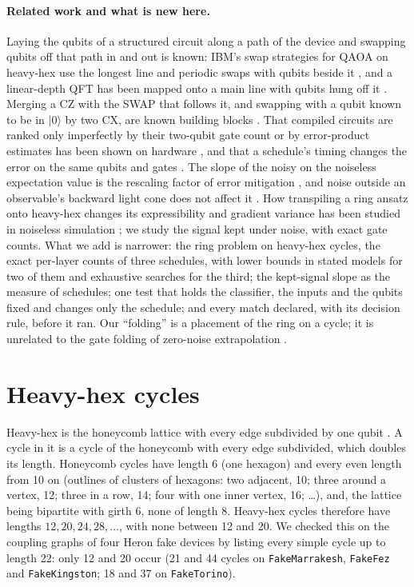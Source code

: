 \documentclass[11pt]{article}
\begin{document}
\paragraph{Related work and what is new here.} Laying the qubits of a structured circuit along a path of the
device and swapping qubits off that path in and out is known: IBM's swap strategies for QAOA on heavy-hex use the
longest line and periodic swaps with qubits beside it \cite{weidenfeller2022}, and a linear-depth QFT has been mapped
onto a main line with qubits hung off it \cite{gao2024}. Merging a CZ with the SWAP that follows it, and swapping with a
qubit known to be in $|0\rangle$ by two CX, are known building blocks \cite{ogorman2019,liu2021rpo}. That compiled
circuits are ranked only imperfectly by their two-qubit gate count or by error-product estimates has been shown on
hardware \cite{nishio2020,hopf2025}, and that a schedule's timing changes the error on the same qubits and gates
\cite{murali2020}. The slope of the noisy on the noiseless expectation value is the rescaling factor of error
mitigation \cite{vovrosh2021,czarnik2021}, and noise outside an observable's backward light cone does not affect it
\cite{tran2023}. How transpiling a ring ansatz onto heavy-hex changes its expressibility and gradient variance has been
studied in noiseless simulation \cite{kashif2026}; we study the signal kept under noise, with exact gate counts. What
we add is narrower: the ring problem on heavy-hex cycles, the exact per-layer counts of three
schedules, with lower bounds in stated models for two of them and exhaustive searches for the third; the kept-signal
slope as the measure of schedules; one test that holds the classifier, the inputs and the qubits fixed and changes only
the schedule; and every match declared, with its decision rule, before it ran.
Our ``folding'' is a placement of the ring on a cycle; it is unrelated to the gate folding of zero-noise
extrapolation \cite{giurgica2020}.

\section{Heavy-hex cycles}
\label{sec:cycles}

Heavy-hex is the honeycomb lattice with every edge subdivided by one qubit \cite{chamberland2020}. A cycle in it is a
cycle of the honeycomb with every edge subdivided, which doubles its length. Honeycomb cycles have length 6 (one
hexagon) and every even length from 10 on (outlines of clusters of hexagons: two adjacent, 10; three around a vertex,
12; three in a row, 14; four with one inner vertex, 16; \dots), and, the lattice being bipartite with girth 6, none of
length 8.
Heavy-hex cycles therefore have lengths $12, 20, 24, 28, \dots$, with none between 12 and 20. We checked this on the
coupling graphs of four Heron fake devices by listing every simple cycle up to length 22: only 12 and 20 occur (21 and
44 cycles on \texttt{FakeMarrakesh}, \texttt{FakeFez} and \texttt{FakeKingston}; 18 and 37 on \texttt{FakeTorino}).
\end{document}
